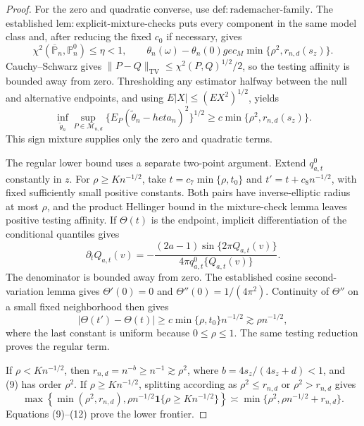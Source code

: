 \documentclass{article}
\begin{document}
\begin{proof}
For the zero and quadratic converse, use \(\mathrm{def{:}rademacher\text{-}family}\). The established \(\mathrm{lem{:}explicit\text{-}mixture\text{-}checks}\) puts every component in the same model class and, after reducing the fixed \(c_0\) if necessary, gives
\[
\chi^2(\overline{\mathbb P}_n,\mathbb P_n^0)\le\eta<1,
\qquad
\theta_n(\omega)-\theta_n(0)ge c_M\min\{\rho^2,r_{n,d}(s_z)\}. \tag{8}
\]
Cauchy--Schwarz gives \(\|P-Q\|_{\mathrm{TV}}\le\chi^2(P,Q)^{1/2}/2\), so the testing affinity is bounded away from zero. Thresholding any estimator halfway between the null and alternative endpoints, and using \(E|X|\le(E X^2)^{1/2}\), yields
\[
\inf_{\widetilde\theta_n}\sup_{P\in\mathcal M_{n,d}}
\{E_P(\widetilde\theta_n-  heta_n)^2\}^{1/2}
\ge c\min\{\rho^2,r_{n,d}(s_z)\}.                               \tag{9}
\]
This sign mixture supplies only the zero and quadratic terms.

The regular lower bound uses a separate two-point argument. Extend \(q_{a,t}^{0}\) constantly in \(z\). For \(\rho\ge K n^{-1/2}\), take \(t=c_7\min\{\rho,t_0\}\) and \(t'=t+c_8n^{-1/2}\), with fixed sufficiently small positive constants. Both pairs have inverse-elliptic radius at most \(\rho\), and the product Hellinger bound in the mixture-check lemma leaves positive testing affinity. If \(\Theta(t)\) is the endpoint, implicit differentiation of the conditional quantiles gives
\[
\partial_tQ_{a,t}(v)
=-\frac{(2a-1)\sin\{2\pi Q_{a,t}(v)\}}
{4\pi q_{a,t}^{0}\{Q_{a,t}(v)\}}.                               \tag{10}
\]
The denominator is bounded away from zero. The established cosine second-variation lemma gives \(\Theta'(0)=0\) and \(\Theta''(0)=1/(4\pi^2)\). Continuity of \(\Theta''\) on a small fixed neighborhood then gives
\[
|\Theta(t')-\Theta(t)|\ge c\min\{\rho,t_0\}n^{-1/2}
\gtrsim\rho n^{-1/2},                                           \tag{11}
\]
where the last constant is uniform because \(0\le\rho\le1\). The same testing reduction proves the regular term.

If \(\rho<K n^{-1/2}\), then \(r_{n,d}=n^{-b}\ge n^{-1}\gtrsim\rho^2\), where \(b=4s_z/(4s_z+d)<1\), and (9) has order \(\rho^2\). If \(\rho\ge K n^{-1/2}\), splitting according as \(\rho^2\le r_{n,d}\) or \(\rho^2>r_{n,d}\) gives
\[
\max\!\left\{\min(\rho^2,r_{n,d}),
\rho n^{-1/2}\mathbf1\{\rho\ge Kn^{-1/2}\}\right\}
\asymp\min\{\rho^2,\rho n^{-1/2}+r_{n,d}\}.                   \tag{12}
\]
Equations (9)--(12) prove the lower frontier.


\end{proof}
\end{document}
